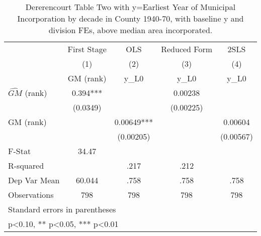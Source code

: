 \begin{table}[htbp]\centering
\def\sym#1{\ifmmode^{#1}\else\(^{#1}\)\fi}
\caption{Dererencourt Table Two with y=Earliest Year of Municipal Incorporation by decade in County 1940-70, with baseline y and division FEs, above median area incorporated.}
\begin{tabular}{l*{4}{c}}
\toprule
                    & First Stage   &         OLS   &Reduced Form   &        2SLS   \\
                    &\multicolumn{1}{c}{(1)}&\multicolumn{1}{c}{(2)}&\multicolumn{1}{c}{(3)}&\multicolumn{1}{c}{(4)}\\
                    &\multicolumn{1}{c}{GM  (rank)}&\multicolumn{1}{c}{y\_L0}&\multicolumn{1}{c}{y\_L0}&\multicolumn{1}{c}{y\_L0}\\
\midrule
$\hat{GM}$ (rank)   &       0.394***&               &     0.00238   &               \\
                    &    (0.0349)   &               &   (0.00225)   &               \\
\addlinespace
GM  (rank)          &               &     0.00649***&               &     0.00604   \\
                    &               &   (0.00205)   &               &   (0.00567)   \\
\midrule
F-Stat              &       34.47   &               &               &               \\
R-squared           &               &        .217   &        .212   &               \\
Dep Var Mean        &      60.044   &        .758   &        .758   &        .758   \\
Observations        &         798   &         798   &         798   &         798   \\
\bottomrule
\multicolumn{5}{l}{\footnotesize Standard errors in parentheses}\\
\multicolumn{5}{l}{\footnotesize * p<0.10, ** p<0.05, *** p<0.01}\\
\end{tabular}
\end{table}
